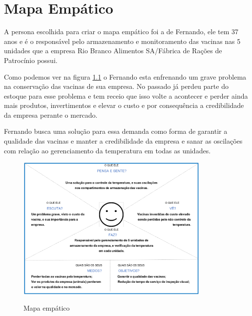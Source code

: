 \chapter{Mapa Empático}

    A persona escolhida para criar o mapa empático
    foi a de Fernando, ele tem 37 anos e é o responsável
    pelo armazenamento e monitoramento das vacinas
    nas 5 unidades que a empresa 
    Rio Branco Alimentos SA/Fábrica de Rações de Patrocínio possui.

    Como podemos ver na figura \ref{fig:mapaEmpatico}
    o Fernando esta enfrenando um grave problema na 
    conservação das vacinas de sua empresa.
    No passado já perdeu parte do estoque para esse problema 
    e tem receio que isso volte a acontecer e perder ainda 
    mais produtos, invertimentos e elevar o custo
    e por consequência a credibilidade da 
    empresa perante o mercado.

    Fernando busca uma solução para essa demanda 
    como forma de garantir a qualidade das vacinas e
    manter a credibilidade da empresa e sanar as
    oscilações com relação ao gerenciamento da temperatura
    em todas as unidades.

    \begin{figure}
        \caption{Mapa empático}
        \centering
        \includegraphics[width=0.85\textwidth]{img/mapa_empatico.png}
        \label{fig:mapaEmpatico}
    \end{figure}
